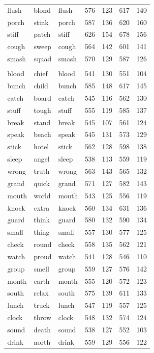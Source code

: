 \documentclass[
]{interact}
\begin{document}
\begin{longtable*}{lllrrrr}
flush & blond & flush & 576 & 123 & 617 & 140 \\ 
porch & stink & porch & 587 & 136 & 620 & 160 \\ 
stiff & patch & stiff & 626 & 154 & 678 & 156 \\ 
cough & sweep & cough & 564 & 142 & 601 & 141 \\ 
smash & squad & smash & 570 & 129 & 587 & 126 \\ 
\midrule\addlinespace[2.5pt]
 \\ 
\midrule\addlinespace[2.5pt]
blood & chief & blood & 541 & 130 & 551 & 104 \\ 
bunch & child & bunch & 585 & 148 & 617 & 145 \\ 
catch & board & catch & 545 & 116 & 562 & 130 \\ 
stuff & tough & stuff & 555 & 119 & 585 & 137 \\ 
break & stand & break & 545 & 107 & 561 & 124 \\ 
speak & beach & speak & 545 & 131 & 573 & 129 \\ 
stick & hotel & stick & 562 & 128 & 598 & 138 \\ 
sleep & angel & sleep & 538 & 113 & 559 & 119 \\ 
wrong & truth & wrong & 563 & 143 & 565 & 132 \\ 
grand & quick & grand & 571 & 127 & 582 & 143 \\ 
mouth & world & mouth & 543 & 125 & 556 & 119 \\ 
knock & extra & knock & 560 & 134 & 631 & 136 \\ 
guard & think & guard & 580 & 132 & 590 & 134 \\ 
small & thing & small & 557 & 130 & 577 & 125 \\ 
check & round & check & 558 & 135 & 562 & 121 \\ 
watch & proud & watch & 541 & 128 & 546 & 110 \\ 
group & smell & group & 559 & 127 & 576 & 142 \\ 
month & earth & month & 555 & 120 & 572 & 123 \\ 
south & relax & south & 575 & 139 & 611 & 133 \\ 
lunch & truck & lunch & 547 & 119 & 557 & 125 \\ 
clock & throw & clock & 548 & 132 & 574 & 124 \\ 
sound & death & sound & 538 & 127 & 552 & 103 \\ 
drink & north & drink & 559 & 129 & 556 & 122 \\ 

\end{longtable*}
\end{document}

